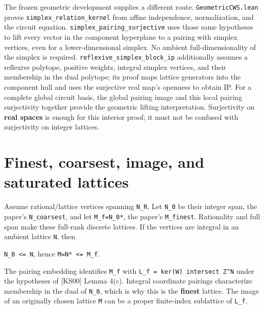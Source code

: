 \documentclass[11pt,a4paper,oneside]{report}
\begin{document}
The frozen geometric development supplies a different route.
\texttt{Geometri\allowbreak{}cCWS.\allowbreak{}lean} proves
\texttt{simplex\_\allowbreak{}relation\allowbreak{}\_\allowbreak{}kernel}
from affine independence, normalization, and the circuit equation.
\texttt{simplex\_\allowbreak{}pairing\_\allowbreak{}surjecti\allowbreak{}ve}
uses those same hypotheses to lift every vector in the component
hyperplane to a pairing with simplex vertices, even for a
lower-dimensional simplex. No ambient full-dimensionality of the simplex
is required.
\texttt{reflexiv\allowbreak{}e\_\allowbreak{}simplex\_\allowbreak{}block\_\allowbreak{}ip}
additionally assumes a reflexive polytope, positive weights, integral
simplex vertices, and their membership in the dual polytope; its proof
maps lattice generators into the component hull and uses the surjective
real map's openness to obtain IP. For a complete global circuit basis,
the global pairing image and this local pairing surjectivity together
provide the geometric lifting interpretation. Surjectivity on
\textbf{real spaces} is enough for this interior proof; it must not be
confused with surjectivity on integer lattices.

\section{Finest, coarsest, image, and saturated
lattices}\label{cws-and-lattice-realizations--finest-coarsest-image-and-saturated-lattices}

Assume rational/lattice vertices spanning \texttt{N\_\allowbreak{}R}.
Let \texttt{N\_\allowbreak{}0} be their integer span, the paper's
\texttt{N\_\allowbreak{}coarsest}, and let
\texttt{M\_\allowbreak{}f=\allowbreak{}N\_\allowbreak{}0*}, the paper's
\texttt{M\_\allowbreak{}finest}. Rationality and full span make these
full-rank discrete lattices. If the vertices are integral in an ambient
lattice \texttt{N}, then

\texttt{N\_\allowbreak{}0 <=\allowbreak{} N}, hence
\texttt{M=\allowbreak{}N* <=\allowbreak{} M\_\allowbreak{}f}.

The pairing embedding identifies \texttt{M\_\allowbreak{}f} with
\texttt{L\_\allowbreak{}f =\allowbreak{} ker(\allowbreak{}W)\allowbreak{} intersec\allowbreak{}t Z\textasciicircum{}N}
under the hypotheses of {[}KS00{]} Lemma 4(c). Integral coordinate
pairings characterize membership in the dual of
\texttt{N\_\allowbreak{}0}, which is why this is the \textbf{finest}
lattice. The image of an originally chosen lattice \texttt{M} can be a
proper finite-index sublattice of \texttt{L\_\allowbreak{}f}.
\end{document}
